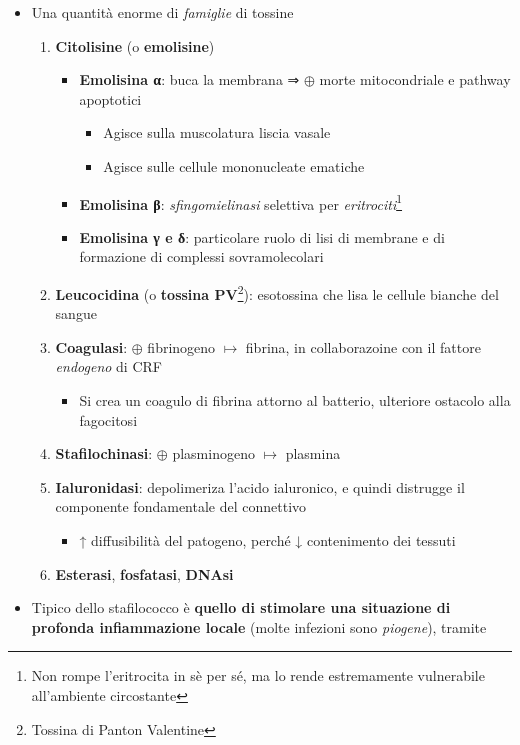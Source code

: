 \documentclass[italian,]{article}
\providecommand{\tightlist}{%
  \setlength{\itemsep}{0pt}\setlength{\parskip}{0pt}}
\newcommand{\att}[0]{ $\oplus$ }                                        %
\begin{document}
\begin{itemize}
\tightlist
\item
  Una quantità enorme di \emph{famiglie} di tossine

  \begin{enumerate}
  \def\labelenumi{\arabic{enumi}.}
  \tightlist
  \item
    \textbf{Citolisine} (o \textbf{emolisine})

    \begin{itemize}
    \tightlist
    \item
      \textbf{Emolisina α}: buca la membrana ⇒ \att morte mitocondriale
      e pathway apoptotici

      \begin{itemize}
      \tightlist
      \item
        Agisce sulla muscolatura liscia vasale
      \item
        Agisce sulle cellule mononucleate ematiche
      \end{itemize}
    \item
      \textbf{Emolisina β}: \emph{sfingomielinasi} selettiva per
      \emph{eritrociti}\footnote{Non rompe l'eritrocita in sè per sé, ma
        lo rende estremamente vulnerabile all'ambiente circostante}
    \item
      \textbf{Emolisina γ e δ}: particolare ruolo di lisi di membrane e
      di formazione di complessi sovramolecolari
    \end{itemize}
  \item
    \textbf{Leucocidina} (o \textbf{tossina PV}\footnote{Tossina di
      Panton Valentine}): esotossina che lisa le cellule bianche del
    sangue
  \item
    \textbf{Coagulasi}: \att fibrinogeno \(\mapsto\) fibrina, in
    collaborazoine con il fattore \emph{endogeno} di CRF

    \begin{itemize}
    \tightlist
    \item
      Si crea un coagulo di fibrina attorno al batterio, ulteriore
      ostacolo alla fagocitosi
    \end{itemize}
  \item
    \textbf{Stafilochinasi}: \att plasminogeno \(\mapsto\) plasmina
  \item
    \textbf{Ialuronidasi}: depolimeriza l'acido ialuronico, e quindi
    distrugge il componente fondamentale del connettivo

    \begin{itemize}
    \tightlist
    \item
      ↑ diffusibilità del patogeno, perché ↓ contenimento dei tessuti
    \end{itemize}
  \item
    \textbf{Esterasi}, \textbf{fosfatasi}, \textbf{DNAsi}
  \end{enumerate}
\item
  Tipico dello stafilococco è \textbf{quello di stimolare una situazione
  di profonda infiammazione locale} (molte infezioni sono
  \emph{piogene}), tramite


\end{itemize}
\end{document}
